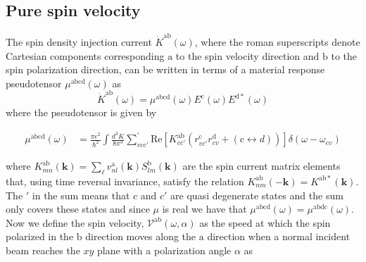\documentclass[prb,11pt,tightenlines,twocolumn,aps]{revtex4-1}
\begin{document}


\subsection{Pure spin velocity} %
\label{sec:theory-pure_spin_current}


The spin density injection current $\dot{K}^{\mathrm{ab}}(\omega)$, 
% 
{
\color{red}
where the roman superscripts denote Cartesian components corresponding
$\mathrm{a}$ to the spin velocity direction and $\mathrm{b}$ to the spin
polarization direction, can be written in terms of a material response
pseudotensor $\mu^{\mathrm{abcd}}(\omega)$ as }
\begin{equation*}
\dot{K}^{\mathrm{ab}}(\omega) = \mu^{\mathrm{abcd}}(\omega)
E^{\mathrm{c}}(\omega) E^{\mathrm{d*}}(\omega)
\label{eq:dotk}
\end{equation*}
where the pseudotensor is given by\cite{bhatPRL05}
\begin{widetext}
\begin{align}
\mu^{\mathrm{abcd}} (\omega) 
&=
\frac{\pi e^{2}}{\hbar^{2}} \int 
\frac{d^{3}K}{8 \pi^{3}}
\sum_{vcc'}^{'}
\mathrm{Re} \left[ K^{\mathrm{ab}}_{cc'} 
\left( 
r^{\mathrm{c}}_{vc'} 
r^{\mathrm{d}}_{cv } +
(c \leftrightarrow d)
\right) 
\right]
\delta(\omega-\omega_{cv})
\label{eq:mu}
\end{align}
\end{widetext}
{\color{red}
where $K^{\mathrm{ab}}_{mn}(\mathbf{k}) =
\sum_{\ell}v^{\mathrm{a}}_{nl}(\mathbf{k}) S^{\mathrm{b}}_{lm}(\mathbf{k})$ are
the spin current matrix elements that, using time reversal invariance, satisfy
the relation $K^{\mathrm{ab}}_{nm}(\mathbf{-k}) = K^{\mathrm{ab*}}(\mathbf{k})
$. 
}%
The $'$ in the sum means that $c$ and $c'$ are quasi degenerate states and
the sum only covers these states and 
{\color{red}
since $\mu$ is real we have that
$\mu^{\mathrm{abcd}}(\omega) = \mu^{\mathrm{abdc}}(\omega)$.
}
Now we define the spin velocity, $\mathcal{V}^{\mathrm{ab}}(\omega,\alpha)$ as
the speed at which the spin polarized in the $\mathrm{b}$   direction moves
along the $\mathrm{a}$ direction when a normal incident beam reaches the $xy$
plane with a polarization angle $\alpha$ as
\end{document}
